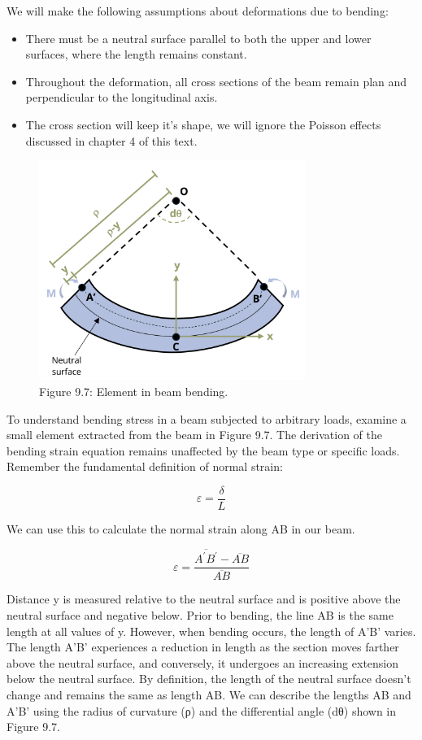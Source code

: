 \documentclass[
  letterpaper,
  DIV=11,
  numbers=noendperiod]{scrreprt}
\begin{document}
We will make the following assumptions about deformations due to
bending:

\begin{itemize}
\item
  There must be a neutral surface parallel to both the upper and lower
  surfaces, where the length remains constant.
\item
  Throughout the deformation, all cross sections of the beam remain plan
  and perpendicular to the longitudinal axis.
\item
  The cross section will keep it's shape, we will ignore the Poisson
  effects discussed in chapter 4 of this text.
\end{itemize}

\begin{figure}[H]

{\centering \includegraphics[width=3.40625in,height=\textheight]{images/CH9 PNGs/Figure 9.7.png}

}

\caption{Figure 9.7: Element in beam bending.}

\end{figure}%

To understand bending stress in a beam subjected to arbitrary loads,
examine a small element extracted from the beam in Figure 9.7. The
derivation of the bending strain equation remains unaffected by the beam
type or specific loads. Remember the fundamental definition of normal
strain:

\[
\varepsilon=\frac{\delta}{L}
\]

We can use this to calculate the normal strain along AB in our beam.

\[
\varepsilon=\frac{\overline{A^{\prime} B^{\prime}}-\overline{A B}}{\overline{A B}}
\]

Distance y is measured relative to the neutral surface and is positive
above the neutral surface and negative below. Prior to bending, the line
AB is the same length at all values of y. However, when bending occurs,
the length of A'B' varies. The length A'B' experiences a reduction in
length as the section moves farther above the neutral surface, and
conversely, it undergoes an increasing extension below the neutral
surface. By definition, the length of the neutral surface doesn't change
and remains the same as length AB. We can describe the lengths AB and
A'B' using the radius of curvature (ρ) and the differential angle (dθ)
shown in Figure 9.7.
\end{document}
